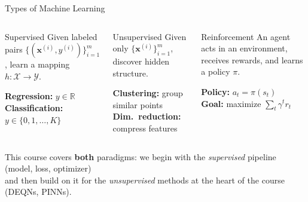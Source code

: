\documentclass[aspectratio=169,11pt]{beamer}
\newcommand{\x}{\bm{x}}
\newcommand{\R}{\mathbb{R}}
\begin{document}
\begin{frame}{Types of Machine Learning}
\begin{columns}[T]
\begin{block}{\centering Supervised}
    Given labeled pairs $\{(\x^{(i)}, y^{(i)})\}_{i=1}^{m}$, learn a mapping $h:\mathcal{X}\to\mathcal{Y}$.

    \vspace{0.3em}
    \textbf{Regression:} $y\in\R$\\
    \textbf{Classification:} $y\in\{0,1,\dots,K\}$
\end{block}

\begin{block}{\centering Unsupervised}
    Given only $\{\x^{(i)}\}_{i=1}^{m}$, discover hidden structure.

    \vspace{0.3em}
    \textbf{Clustering:} group similar points\\
    \textbf{Dim.\ reduction:} compress features
\end{block}

\begin{block}{\centering Reinforcement}
    An agent acts in an environment, receives rewards, and learns a policy $\pi$.

    \vspace{0.3em}
    \textbf{Policy:} $a_t = \pi(s_t)$\\
    \textbf{Goal:} maximize $\sum_t \gamma^t r_t$
\end{block}
\end{columns}

\vspace{0.5cm}
\begin{center}
{\small This course covers \textbf{both} paradigms: we begin with the \emph{supervised} pipeline (model, loss, optimizer)\\
and then build on it for the \emph{unsupervised} methods at the heart of the course (DEQNs, PINNs).}
\end{center}
\end{frame}
\end{document}
